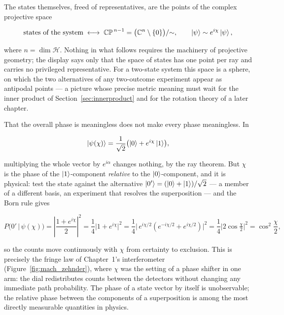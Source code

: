 The states themselves, freed of representatives, are the points of the complex projective space
\begin{linenomath}
\begin{equation}
    \text{states of the system}
    \;\longleftrightarrow\;
    \mathbb{CP}^{\,n-1}
    =
    \bigl(\mathbb{C}^{n}\setminus\{0\}\bigr)/{\sim},
    \qquad
    \ket{\psi}\sim e^{i\chi}\ket{\psi},
\end{equation}
\end{linenomath}
where $n=\dim\mathcal{H}$. Nothing in what follows requires the machinery of projective geometry; the display says only that the space of states has one point per ray and carries no privileged representative. For a two-state system this space is a sphere, on which the two alternatives of any two-outcome experiment appear as antipodal points --- a picture whose precise metric meaning must wait for the inner product of Section~\ref{sec:innerproduct} and for the rotation theory of a later chapter.

That the overall phase is meaningless does not make every phase meaningless. In
\begin{linenomath}
\begin{equation}
    \ket{\psi(\chi)}=\frac{1}{\sqrt{2}}\bigl(\ket{0}+e^{i\chi}\ket{1}\bigr),
\end{equation}
\end{linenomath}
multiplying the whole vector by $e^{i\alpha}$ changes nothing, by the ray theorem. But $\chi$ is the phase of the $\ket{1}$-component \emph{relative} to the $\ket{0}$-component, and it is physical: test the state against the alternative $\ket{0'}=(\ket{0}+\ket{1})/\sqrt{2}$ --- a member of a different basis, an experiment that resolves the superposition --- and the Born rule gives
\begin{linenomath}
\begin{equation}
    P\bigl(0'\,\big|\,\psi(\chi)\bigr)
    =
    \left|\frac{1+e^{i\chi}}{2}\right|^2
    =
    \frac{1}{4}\bigl|1+e^{i\chi}\bigr|^2
    =
    \frac{1}{4}\bigl|\,e^{i\chi/2}(e^{-i\chi/2}+e^{i\chi/2})\bigr|^2
    =
    \frac{1}{4}\bigl|2\cos\tfrac{\chi}{2}\bigr|^2
    =
    \cos^2\frac{\chi}{2},
\end{equation}
\end{linenomath}
so the counts move continuously with $\chi$ from certainty to exclusion. This is precisely the fringe law of Chapter~1's interferometer (Figure~\ref{fig:mach_zehnder}), where $\chi$ was the setting of a phase shifter in one arm: the dial redistributes counts between the detectors without changing any immediate path probability. The phase of a state vector by itself is unobservable; the relative phase between the components of a superposition is among the most directly measurable quantities in physics.

